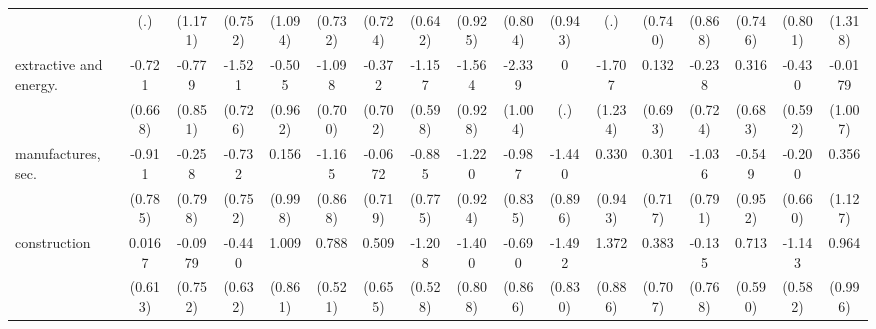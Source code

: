 {\begin{tabular}{l*{16}{c}}
                    &         (.)         &     (1.171)         &     (0.752)         &     (1.094)         &     (0.732)         &     (0.724)         &     (0.642)         &     (0.925)         &     (0.804)         &     (0.943)         &         (.)         &     (0.740)         &     (0.868)         &     (0.746)         &     (0.801)         &     (1.318)         \\
[1em]
extractive and energy.&      -0.721         &      -0.779         &      -1.521\sym{*}  &      -0.505         &      -1.098         &      -0.372         &      -1.157         &      -1.564         &      -2.339\sym{*}  &           0         &      -1.707         &       0.132         &      -0.238         &       0.316         &      -0.430         &     -0.0179         \\
                    &     (0.668)         &     (0.851)         &     (0.726)         &     (0.962)         &     (0.700)         &     (0.702)         &     (0.598)         &     (0.928)         &     (1.004)         &         (.)         &     (1.234)         &     (0.693)         &     (0.724)         &     (0.683)         &     (0.592)         &     (1.007)         \\
[1em]
manufactures, sec.  &      -0.911         &      -0.258         &      -0.732         &       0.156         &      -1.165         &     -0.0672         &      -0.885         &      -1.220         &      -0.987         &      -1.440         &       0.330         &       0.301         &      -1.036         &      -0.549         &      -0.200         &       0.356         \\
                    &     (0.785)         &     (0.798)         &     (0.752)         &     (0.998)         &     (0.868)         &     (0.719)         &     (0.775)         &     (0.924)         &     (0.835)         &     (0.896)         &     (0.943)         &     (0.717)         &     (0.791)         &     (0.952)         &     (0.660)         &     (1.127)         \\
[1em]
construction        &      0.0167         &     -0.0979         &      -0.440         &       1.009         &       0.788         &       0.509         &      -1.208\sym{*}  &      -1.400         &      -0.690         &      -1.492         &       1.372         &       0.383         &      -0.135         &       0.713         &      -1.143\sym{*}  &       0.964         \\
                    &     (0.613)         &     (0.752)         &     (0.632)         &     (0.861)         &     (0.521)         &     (0.655)         &     (0.528)         &     (0.808)         &     (0.866)         &     (0.830)         &     (0.886)         &     (0.707)         &     (0.768)         &     (0.590)         &     (0.582)         &     (0.996)         \\

\end{tabular}}
